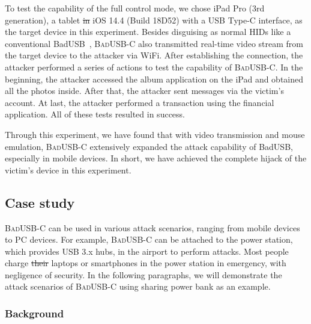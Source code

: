 \documentclass[conference]{IEEEtran}
\newcommand{\tool}{\mbox{\textsc{BadUSB-C}}\xspace}
\providecommand{\DIFaddtex}[1]{{\protect\color{blue}\uwave{#1}}} %
\providecommand{\DIFdeltex}[1]{{\protect\color{red}\sout{#1}}}                      %
\providecommand{\DIFaddbegin}{} %
\providecommand{\DIFaddend}{} %
\providecommand{\DIFdelbegin}{} %
\providecommand{\DIFdelend}{} %
\providecommand{\DIFadd}[1]{\texorpdfstring{\DIFaddtex{#1}}{#1}} %
\providecommand{\DIFdel}[1]{\texorpdfstring{\DIFdeltex{#1}}{}} %
\newcommand{\DIFscaledelfig}{0.5}
\newlength{\DIFdelgraphicswidth} %
\newlength{\DIFdelgraphicsheight} %
\newcommand{\DIFaddincludegraphics}[2][]{{\color{blue}\fbox{\DIFOincludegraphics[#1]{#2}}}} %
\newcommand{\DIFdelincludegraphics}[2][]{%
\sbox{\DIFdelgraphicsbox}{\DIFOincludegraphics[#1]{#2}}%
\settoboxwidth{\DIFdelgraphicswidth}{\DIFdelgraphicsbox} %
\settoboxtotalheight{\DIFdelgraphicsheight}{\DIFdelgraphicsbox} %
\scalebox{\DIFscaledelfig}{%
\parbox[b]{\DIFdelgraphicswidth}{\usebox{\DIFdelgraphicsbox}\\[-\baselineskip] \rule{\DIFdelgraphicswidth}{0em}}\llap{\resizebox{\DIFdelgraphicswidth}{\DIFdelgraphicsheight}{%
\setlength{\unitlength}{\DIFdelgraphicswidth}%
\begin{picture}(1,1)%
\thicklines\linethickness{2pt} %
{\color[rgb]{1,0,0}\put(0,0){\framebox(1,1){}}}%
{\color[rgb]{1,0,0}\put(0,0){\line( 1,1){1}}}%
{\color[rgb]{1,0,0}\put(0,1){\line(1,-1){1}}}%
\end{picture}%
}\hspace*{3pt}}} %
} %
\DeclareRobustCommand{\DIFaddbegin}{\DIFOaddbegin \let\includegraphics\DIFaddincludegraphics} %
\DeclareRobustCommand{\DIFaddend}{\DIFOaddend \let\includegraphics\DIFOincludegraphics} %
\DeclareRobustCommand{\DIFdelbegin}{\DIFOdelbegin \let\includegraphics\DIFdelincludegraphics} %
\DeclareRobustCommand{\DIFdelend}{\DIFOaddend \let\includegraphics\DIFOincludegraphics} %
\begin{document}
To test the capability of the full control mode, we chose iPad Pro (3rd
	generation), a tablet \DIFdelbegin \DIFdel{in }\DIFdelend \DIFaddbegin \DIFadd{running }\DIFaddend iOS 14.4 (Build 18D52) with a \ac{USB} Type-C interface, as the target
device in this experiment.  Besides disguising \DIFaddbegin \DIFadd{themself }\DIFaddend as normal \acp{HID} like a
conventional BadUSB~\cite{badusb}, \tool also transmitted real-time video
stream from the target device to the attacker via WiFi.  After establishing the connection, the attacker performed a series of actions to test the capability of
\tool. In the beginning, the attacker accessed the album application on the iPad and
obtained all the photos inside. After that, the attacker sent messages via the victim's
account. At last, the attacker performed a transaction using the
financial application. All of these tests resulted in success.

Through this experiment, we have found that with video transmission and mouse
emulation, \tool extensively expanded the attack capability of BadUSB,
especially in mobile devices. In short, we have achieved the complete hijack of the victim's
device in this experiment.

\subsection{Case study}
\label{subsec:case_study}
\tool can be used in various attack scenarios, ranging from mobile devices to PC devices.
For example, \tool can be attached to the power station, which provides USB 3.x hubs, in the airport to perform attacks.
Most people charge \DIFdelbegin \DIFdel{their }\DIFdelend laptops or smartphones in the power station in emergency, with negligence of security.
In the following paragraphs, we will demonstrate the attack scenarios of \tool using sharing power bank as an example.

\subsubsection{Background}
\end{document}
